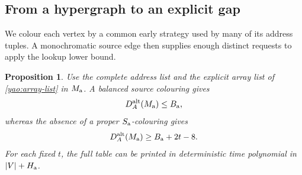 \documentclass[11pt]{article} \usepackage[utf8]{inputenc}
\theoremstyle{plain} \newtheorem{theorem}{Theorem}[section]
\newtheorem{proposition}[proposition]{Proposition}
\theoremstyle{definition} \newaliascnt{definition}{theorem}
\begin{document}
\subsection{From a hypergraph to an explicit gap}

We colour each vertex by a common early strategy used by many of its address
tuples. A monochromatic source edge then supplies enough distinct requests to
apply the lookup lower bound.

\begin{proposition}\label{yao:lift}
Use the complete address list and the explicit array list of
\cref{yao:array-list} in $M_{\rm a}$. A balanced source colouring gives
\[
D_A^{\rm alt}(M_{\rm a})\le B_{\rm a},
\]
whereas the absence of a proper $S_{\rm a}$-colouring gives
\[
D_A^{\rm alt}(M_{\rm a})\ge B_{\rm a}+2t-8.
\]
For each fixed $t$, the full table can be printed in deterministic time
polynomial in $|V|+H_{\rm a}$.
\end{proposition}
\end{document}
